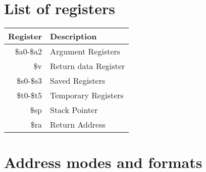 \documentclass[12pt]{article}
\begin{document}
\section{List of registers}
\begin{tabular}{| r | l |}
\hline
\textbf{Register} & \textbf{Description}\\
\hline
\$a0-\$a2 & Argument Registers\\
\$v & Return data Register\\
\$s0-\$s3 & Saved Registers\\
\$t0-\$t5 & Temporary Registers\\
\$sp & Stack Pointer\\
\$ra & Return Address\\ 
\hline
\end {tabular}

\section{Address modes and formats}
\end{document}
